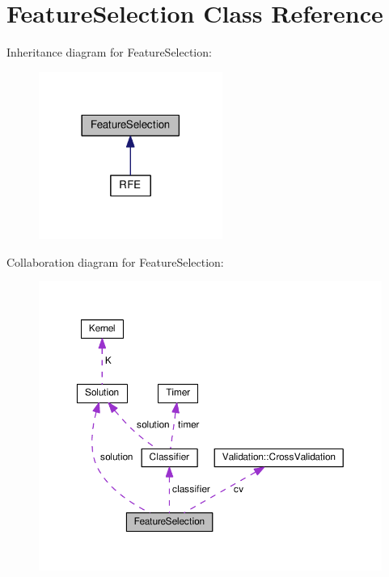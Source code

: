 \hypertarget{class_feature_selection}{}\section{Feature\+Selection Class Reference}
\label{class_feature_selection}


Inheritance diagram for Feature\+Selection\+:
\nopagebreak
\begin{figure}[H]
\begin{center}
\leavevmode
\includegraphics[width=170pt]{class_feature_selection__inherit__graph}
\end{center}
\end{figure}


Collaboration diagram for Feature\+Selection\+:
\nopagebreak
\begin{figure}[H]
\begin{center}
\leavevmode
\includegraphics[width=350pt]{class_feature_selection__coll__graph}
\end{center}
\end{figure}
